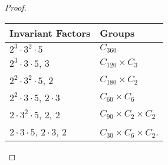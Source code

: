 \documentclass[10pt]{amsart}
\begin{document}
\begin{thm}
\begin{proof}
\begin{enumerate}[(a)]
      \begin{center}
        \begin{tabular}{l | l}
          Invariant Factors & Groups\\
          \hline
          $2^3 \cdot 3^2 \cdot 5$ & $C_{360}$\\
          $2^3 \cdot 3 \cdot 5$, 3 & $C_{120} \times C_3$\\
          $2^2 \cdot 3^2 \cdot 5$, 2 & $C_{180} \times C_2$\\
          $2^2 \cdot 3 \cdot 5$, $2 \cdot 3$ & $C_{60} \times C_6$\\
          $2 \cdot 3^2 \cdot 5$, 2, 2 & $C_{90} \times C_2 \times C_2$\\
          $2 \cdot 3 \cdot 5$, $2\cdot 3$, 2 & $C_{30} \times C_6 \times C_2$.\\
        \end{tabular}
      \end{center}
    \end{enumerate}
  \end{proof}
\end{thm}
\end{document}
